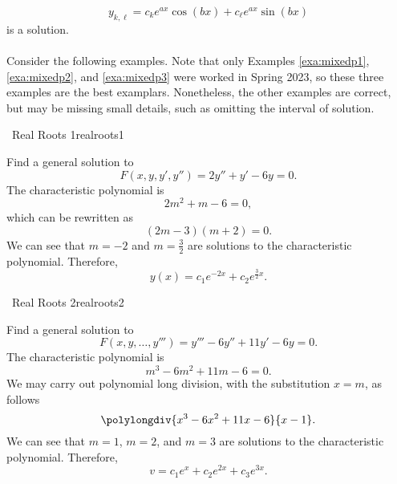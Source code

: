         \begin{equation*}
            y_{k,\ell}=c_ke^{ax}\cos(bx)+c_\ell e^{ax}\sin(bx)
        \end{equation*}
        is a solution.
        \pagebreak
        \\
        \\
        Consider the following examples. Note that only Examples \ref{exa:mixedp1}, \ref{exa:mixedp2}, and \ref{exa:mixedp3} were worked in Spring 2023, so these three examples are the best examplars. Nonetheless, the other examples are correct, but may be missing small details, such as omitting the interval of solution. 
        \begin{example}{\Difficulty\,\Difficulty\,\,Real Roots 1}{realroots1}
            
            Find a general solution to
            \begin{equation*}
                F(x,y,y',y'')=2y''+y'-6y=0.
            \end{equation*}
            The characteristic polynomial is
            \begin{equation*}
                2m^2+m-6=0,
            \end{equation*}
            which can be rewritten as
            \begin{equation*}
                (2m-3)(m+2)=0.
            \end{equation*}
            We can see that \(m=-2\) and \(m=\frac{3}{2}\) are solutions to the characteristic polynomial. Therefore,
            \begin{equation*}
                y(x)=c_1e^{-2x}+c_2e^{\frac{3}{2}x}.
            \end{equation*}
        
        \end{example}
        \begin{example}{\Difficulty\,\Difficulty\,\,Real Roots 2}{realroots2}
        
            Find a general solution to
            \begin{equation*}
                F(x,y,\ldots,y''')=y'''-6y''+11y'-6y=0.
            \end{equation*}
            The characteristic polynomial is
            \begin{equation*}
                m^3-6m^2+11m-6=0.
            \end{equation*}
            We may carry out polynomial long division, with the substitution \(x=m\), as follows
            \begin{equation*}
                \polylongdiv{x^3-6x^2+11x-6}{x-1}.
            \end{equation*}
            We can see that \(m=1\), \(m=2\), and \(m=3\) are solutions to the characteristic polynomial. Therefore, 
            \begin{equation*}
                v=c_1e^x+c_2e^{2x}+c_3e^{3x}.
            \end{equation*}
        
        \end{example}
